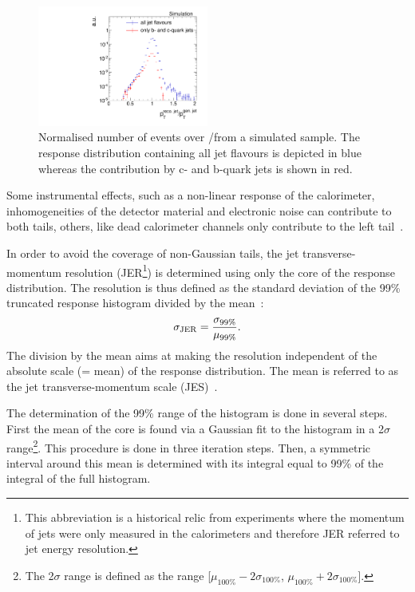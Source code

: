 \begin{figure}[!b]
  \centering
      \includegraphics[width=0.50\textwidth]{figures/resolution/generalApproach/intrinsicExampleContributionofBCQuarks.pdf}
  \caption{Normalised number of events over \ptrecojet/\ptgenjet from a simulated \GAMJET sample. 
          The response distribution containing all jet flavours is depicted in blue whereas the contribution by c- and b-quark jets is shown in red. }  
  \label{res:fig:TypicalResponse}
\end{figure}
Some instrumental effects, such as a non-linear response of the calorimeter, inhomogeneities of the detector material and electronic noise can contribute to both tails, 
others, like dead calorimeter channels only contribute to the left tail~\cite{bib:Matthias_Thesis}. 

In order to avoid the coverage of non-Gaussian tails, the jet transverse-momentum resolution (JER\footnote{This abbreviation is a historical relic from experiments where the momentum of jets were only measured in the calorimeters and therefore JER referred to jet energy resolution.}) is determined using only the core of the response distribution.
The resolution is thus defined as the standard deviation of the 99\% truncated response histogram divided by the mean~\cite{bib:CMS-AN-2010-076}:
\begin{equation*}\label{res:eq:resolutionFormula}
\sigma_\mathrm{JER} = \frac{\sigma_{99\%}}{\mu_{99\%}}.
\end{equation*}
The division by the mean aims at making the resolution independent of the absolute scale (= mean) of the response distribution.
The mean is referred to as the jet transverse-momentum scale (JES)~\cite{bib:CMS:JERCPaper_2011}.

The determination of the 99\% range of the histogram is done in several steps. 
First the mean of the core is found via a Gaussian fit to the histogram in a 2$\sigma$ range\footnote{The 2$\sigma$ range is defined as the range [$\mu_{100\%} - 2\sigma_{100\%}$, $\mu_{100\%} + 2\sigma_{100\%}$].}. 
This procedure is done in three iteration steps.
Then, a symmetric interval around this mean is determined with its integral equal to 99\% of the integral of the full histogram. 

